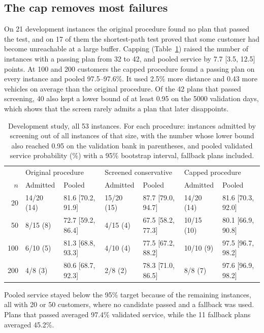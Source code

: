 \documentclass[12pt,letterpaper]{article}
\begin{document}
\subsection{The cap removes most failures}

On 21 development instances the original procedure found no plan that
passed the test, and on 17 of them the shortest-path test proved
that some customer had become unreachable at a large buffer. Capping
(Table~\ref{tab:screen}) raised the number of instances with a passing plan from
32 to 42, and pooled service by
7.7 [3.5, 12.5] points. At 100 and 200 customers the capped procedure found a
passing plan on every instance and pooled 97.5--97.6\%. It used
2.5\% more distance and 0.43 more vehicles on average
than the original procedure. Of the 42 plans that passed screening,
40 also kept a lower bound of at least 0.95 on the 5000 validation
days, which shows that the screen rarely admits a plan that later disappoints.

\begin{table}[t]
\centering
\footnotesize
\setlength{\tabcolsep}{4pt}
\caption{Development study, all 53 instances. For each procedure: instances admitted by screening out of all instances of that size, with the number whose lower bound also reached 0.95 on the validation bank in parentheses, and pooled validated service probability (\%) with a 95\% bootstrap interval, fallback plans included.}
\label{tab:screen}
\begin{tabular}{@{}rllllll@{}}
\toprule
 & \multicolumn{2}{l}{Original procedure} & \multicolumn{2}{l}{Screened conservative} & \multicolumn{2}{l}{Capped procedure}\\
$n$ & Admitted & Pooled & Admitted & Pooled & Admitted & Pooled\\
\midrule
20 & 14/20 (14) & 81.6 [70.2, 91.9] & 15/20 (15) & 87.7 [79.0, 94.7] & 14/20 (14) & 81.6 [70.3, 92.0]\\
50 & 8/15 (8) & 72.7 [59.2, 86.4] & 4/15 (4) & 67.5 [58.2, 77.3] & 10/15 (10) & 80.1 [66.9, 90.8]\\
100 & 6/10 (5) & 81.3 [68.8, 93.3] & 4/10 (4) & 77.5 [67.2, 88.2] & 10/10 (9) & 97.5 [96.7, 98.2]\\
200 & 4/8 (3) & 80.6 [68.7, 92.3] & 2/8 (2) & 78.3 [71.0, 86.5] & 8/8 (7) & 97.6 [96.9, 98.2]\\
\bottomrule
\end{tabular}
\end{table}

Pooled service stayed below the 95\% target because of the remaining instances,
all with 20 or 50 customers, where no candidate passed and a fallback was used.
Plans that passed averaged 97.4\% validated service, while the
11 fallback plans averaged 45.2\%.
\end{document}
